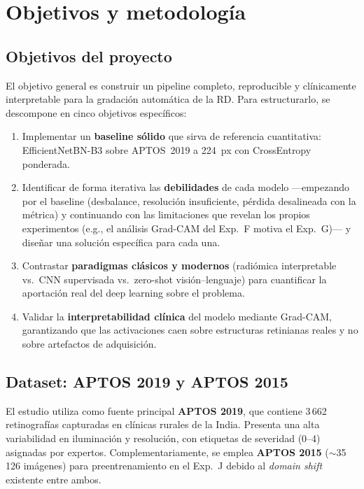 \documentclass[12pt, a4paper]{article}
\begin{document}
\section{Objetivos y metodología}
\label{sec:metodologia}

\subsection{Objetivos del proyecto}

El objetivo general es construir un pipeline completo, reproducible y
clínicamente interpretable para la gradación automática de la RD. Para
estructurarlo, se descompone en cinco objetivos específicos:

\begin{enumerate}[label=\textbf{O\arabic*.}]
  \item Implementar un \textbf{baseline sólido} que sirva de referencia
        cuantitativa: EfficientNetBN-B3 sobre APTOS~2019 a 224~px con
        CrossEntropy ponderada.
     \item Identificar de forma iterativa las \textbf{debilidades} de cada modelo
        ---empezando por el baseline (desbalance, resolución insuficiente,
        pérdida desalineada con la métrica) y continuando con las
        limitaciones que revelan los propios experimentos (e.g., el
        análisis Grad-CAM del Exp.~F motiva el Exp.~G)--- y diseñar una
        solución específica para cada una.
  \item Contrastar \textbf{paradigmas clásicos y modernos} (radiómica
        interpretable vs.\ CNN supervisada vs.\ zero-shot visión--lenguaje)
        para cuantificar la aportación real del deep learning sobre el problema.
  \item Validar la \textbf{interpretabilidad clínica} del modelo mediante
        Grad-CAM, garantizando que las activaciones caen sobre estructuras
        retinianas reales y no sobre artefactos de adquisición.
\end{enumerate}

\subsection{Dataset: APTOS 2019 y APTOS 2015}
\label{sec:dataset}
El estudio utiliza como fuente principal \textbf{APTOS 2019}, que contiene 3\,662 retinografías capturadas en clínicas rurales de la India. Presenta una alta variabilidad en iluminación y resolución, con etiquetas de severidad (0--4) asignadas por expertos. Complementariamente, se emplea \textbf{APTOS 2015} ($\sim$35\,126 imágenes) para preentrenamiento en el Exp.~J debido al \textit{domain shift} existente entre ambos.
\end{document}
